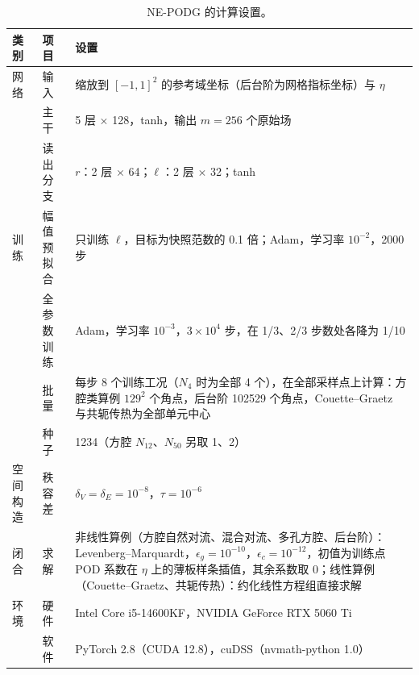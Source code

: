 \begin{table}[H]
\centering
\caption{NE-PODG 的计算设置。}
\label{tab:settings}
\small
\begin{tabular}{llp{}}
\toprule
类别 & 项目 & 设置 \\
\midrule
网络 & 输入 & 缩放到 $[-1,1]^2$ 的参考域坐标（后台阶为网格指标坐标）与 $\eta$ \\
 & 主干 & 5 层 $\times$ 128，tanh，输出 $m=256$ 个原始场 \\
 & 读出分支 & $r$：2 层 $\times$ 64；$\ell$：2 层 $\times$ 32；tanh \\
训练 & 幅值预拟合 & 只训练 $\ell$，目标为快照范数的 0.1 倍；Adam，学习率 $10^{-2}$，2000 步 \\
 & 全参数训练 & Adam，学习率 $10^{-3}$，$3\times10^4$ 步，在 1/3、2/3 步数处各降为 1/10 \\
 & 批量 & 每步 8 个训练工况（$N_4$ 时为全部 4 个），在全部采样点上计算：方腔类算例 $129^2$ 个角点，后台阶 102529 个角点，Couette--Graetz 与共轭传热为全部单元中心 \\
 & 种子 & 1234（方腔 $N_{12}$、$N_{50}$ 另取 1、2） \\
空间构造 & 秩容差 & $\delta_V=\delta_E=10^{-8}$，$\tau=10^{-6}$ \\
闭合 & 求解 & 非线性算例（方腔自然对流、混合对流、多孔方腔、后台阶）：Levenberg--Marquardt，$\epsilon_g=10^{-10}$，$\epsilon_c=10^{-12}$，初值为训练点 POD 系数在 $\eta$ 上的薄板样条插值，其余系数取 0；线性算例（Couette--Graetz、共轭传热）：约化线性方程组直接求解 \\
环境 & 硬件 & Intel Core i5-14600KF，NVIDIA GeForce RTX 5060 Ti \\
 & 软件 & PyTorch 2.8（CUDA 12.8），cuDSS（nvmath-python 1.0） \\
\bottomrule
\end{tabular}
\end{table}
